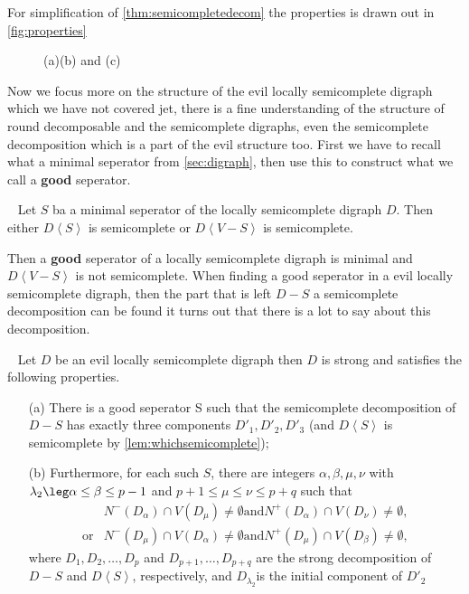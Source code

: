 For simplification of \autoref{thm:semicompletedecom} the properties is drawn out in \autoref{fig:properties}
\begin{figure}
    \caption{(a)(b) and (c)}
    \label{fig:properties}
\end{figure}
Now we focus more on the structure of the evil locally semicomplete digraph which we have not covered jet, there is a fine understanding of the structure of round decomposable and the semicomplete digraphs, even the semicomplete decomposition which is a part of the evil structure too.
First we have to recall what a minimal seperator from \autoref{sec:digraph}, then use this to construct what we call a \textbf{good} seperator.
\begin{lemma}~\cite{bangJGT85}
    Let $S$ ba a minimal seperator of the locally semicomplete digraph $D$. Then either $D\left< S\right>$ is semicomplete or $D\left< V-S\right>$ is semicomplete.
    \label{lem:whichsemicomplete}
\end{lemma}
Then a \textbf{good} seperator of a locally semicomplete digraph is minimal and $D\left<V-S\right>$ is not semicomplete.
When finding a good seperator in a evil locally semicomplete digraph, then the part that is left $D-S$ a semicomplete decomposition can be found it turns out that there is a lot to say about this decomposition.
\begin{thm}~\cite{bangJGT85,bangJCT102}
    Let $D$ be an evil locally semicomplete digraph then $D$ is strong and satisfies the following properties.
    \begin{itemize}
        \item[(a)]There is a good seperator S such that the semicomplete decomposition of $D-S$ has exactly three components $D'_1,D'_2,D'_3$ (and $D\left<S\right>$ is semicomplete by \autoref{lem:whichsemicomplete});
        \item[(b)] Furthermore, for each such $S$, there are integers $\alpha, \beta,\mu,\nu$ with $\lambda_2\leg \alpha \leq \beta \leq p-1$ and $p+1\leq \mu \leq \nu \leq p+q$ such that 
        \begin{align}
            &N^-(D_\alpha)\cap V(D_\mu)\neq \emptyset \text{and} N^+(D_\alpha)\cap V(D_\nu)\neq \emptyset,\\
            \text{or} &N^-(D_\mu)\cap V(D_\alpha)\neq \emptyset \text{and} N^+(D_\mu)\cap V(D_\beta)\neq \emptyset,
        \end{align} 
        where $D_1,D_2,\dots, D_p$ and $D_{p+1},\dots,D_{p+q}$ are the strong decomposition of $D-S$ and $D\left< S\right>$, respectively, and $D_{\lambda_2}$is the initial component of $D'_2$ 
    \end{itemize}
    \label{thm:evildecom}
\end{thm}
